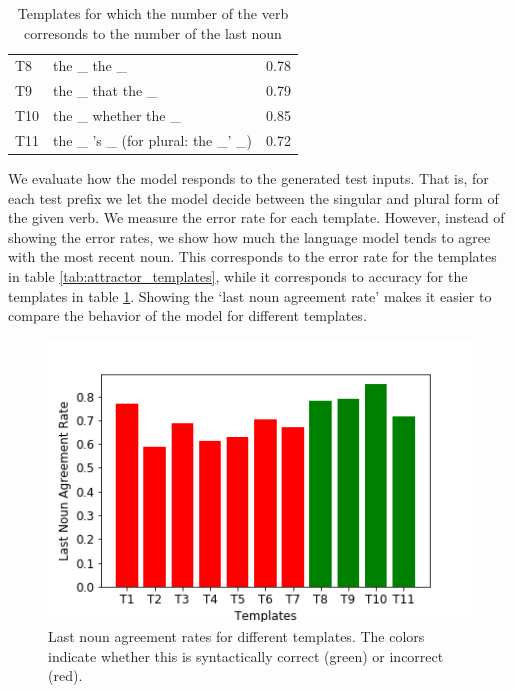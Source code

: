 \begin{table}
\parbox{\linewidth}{
\centering
\begin{tabular}{ l l r }
  T8    & the \_ the \_         &  0.78\\
  T9    & the \_ that the \_    &  0.79\\
  T10   & the \_ whether the \_ &  0.85\\
  T11   & the \_ 's \_ (for plural: the \_' \_)          &  0.72 
\end{tabular}
\caption{Templates for which the number of the verb 
corresonds to the number of the last noun} 
\label{tab:lastnoun_templates}
}
\end{table}


We evaluate how the model responds to the generated test inputs.
That is, for each test prefix we let the model decide between 
the singular and plural form of the given verb. 
We measure the error rate for each template.
However, instead of showing the error rates, we
show how much the language model tends to agree with the most recent noun.
This corresponds to the error rate for the templates in table \ref{tab:attractor_templates},
while it corresponds to accuracy for the templates in table \ref{tab:lastnoun_templates}.
Showing the `last noun agreement rate' makes it easier
to compare the behavior of the model for different templates.

\begin{figure}
    \centering
\includegraphics[scale=0.5]{syntactic_templates} 
\caption{Last noun agreement rates for different templates.
The colors indicate whether this is syntactically correct (green)
or incorrect (red).
}
\label{fig:last_noun_rates}
\end{figure}


